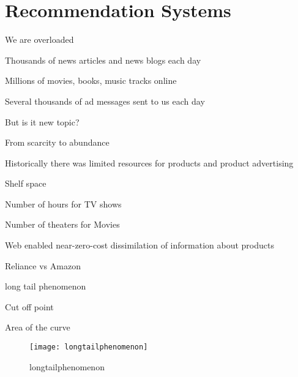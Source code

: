 	\chapter{Recommendation Systems}

	\begin{bulletedlist}
		\item We are overloaded
		\begin{bulletedlist}
			\item Thousands of news articles and news blogs each day
			\item Millions of movies, books, music tracks online
			\item Several thousands of ad messages sent to us each day
			\item But is it new topic?
		\end{bulletedlist}
		\item From scarcity to abundance
		\begin{bulletedlist}
			\item Historically there was limited resources for products and product advertising
			\begin{bulletedlist}
				\item Shelf space
				\item Number of hours for TV shows
				\item Number of theaters for Movies
			\end{bulletedlist}
			\item Web enabled near-zero-cost dissimilation of information about products
			\begin{bulletedlist}
				\item Reliance vs Amazon
				\item long tail phenomenon
				\begin{bulletedlist}
					\item Cut off point
					\item Area of the curve
				\end{bulletedlist}
			\end{bulletedlist}
		\end{bulletedlist}
	\end{bulletedlist}

	\begin{figure}
		\centering
		\texttt{[image: longtailphenomenon]}
		\caption{longtailphenomenon}
		\label{fig:longtailphenomenon}
	\end{figure}


